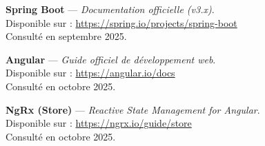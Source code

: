 \documentclass[12pt,a4paper]{report}
\begin{document}
\begin{enumerate}[leftmargin=*, label={\textcolor{cuivre}{\textbf{[\arabic*]}}}, resume]

    \item \textbf{Spring Boot} — \textit{Documentation officielle (v3.x)}. \\
    Disponible sur : \url{https://spring.io/projects/spring-boot}\\
    \textcolor{grisfonce}{Consulté en septembre 2025.}

    \vspace{0.3cm}

    \item \textbf{Angular} — \textit{Guide officiel de développement web}. \\
    Disponible sur : \url{https://angular.io/docs}\\
    \textcolor{grisfonce}{Consulté en octobre 2025.}

    \vspace{0.3cm}

    \item \textbf{NgRx (Store)} — \textit{Reactive State Management for Angular}. \\
    Disponible sur : \url{https://ngrx.io/guide/store}\\
    \textcolor{grisfonce}{Consulté en octobre 2025.}

\end{enumerate}
\end{document}
